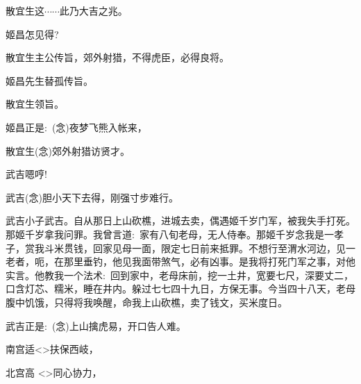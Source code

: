 {散宜生\hspace{20pt}这$\cdots{}\cdots{}$此乃大吉之兆。

姬昌\hspace{30pt}怎见得?

散宜生\hspace{20pt}主公传旨，郊外射猎，不得虎臣，必得良将。

姬昌\hspace{30pt}先生替孤传旨。

散宜生\hspace{20pt}领旨。

姬昌\hspace{30pt}正是:~({\akai 念})夜梦飞熊入帐来，

	散宜生\hspace{20pt}({\akai 念})郊外射猎访贤才。

\vspace{5pt}

武吉\hspace{30pt}嗯哼!

武吉\hspace{30pt}({\akai 念})胆小天下去得，刚强寸步难行。

\setlength{\hangindent}{56pt}   %
{武吉\hspace{30pt}小子武吉。自从那日上山砍樵，进城去卖，偶遇姬千岁门军，被我失手打死。那姬千岁拿我问罪。我曾言道:~家有八旬老母，无人侍奉。那姬千岁念我是一孝子，赏我斗米贯钱，回家见母一面，限定七日前来抵罪。不想行至渭水河边，见一老者，呃，在那里垂钓，他见我面带煞气，必有凶事。是我将打死门军之事，对他实言。他教我一个法术:~回到家中，老母床前，挖一土井，宽要七尺，深要丈二，口含灯芯、糯米，睡在井内。躲过七七四十九日，方保无事。今当四十八天，老母腹中饥饿，只得将我唤醒，命我上山砍樵，卖了钱文，买米度日。}

武吉\hspace{30pt}正是:~({\akai 念})上山擒虎易，开口告人难。

\vspace{5pt}

	南宫适\hspace{20pt}\textless{}\!\textgreater{}扶保西岐，

北宫高\hspace{20pt} \textless{}\!\textgreater{}同心协力，

}
